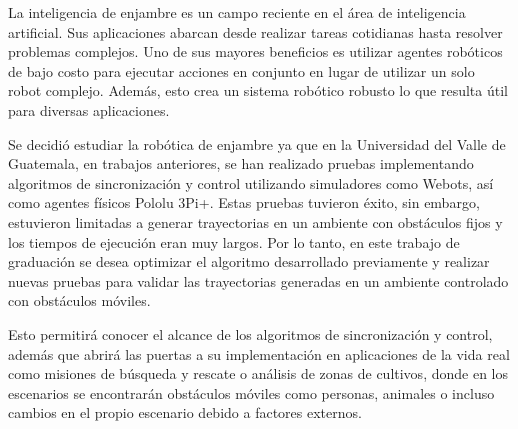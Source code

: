 La inteligencia de enjambre es un campo reciente en el área de inteligencia artificial. Sus aplicaciones abarcan desde realizar tareas cotidianas hasta resolver problemas complejos. Uno de sus mayores beneficios es utilizar agentes robóticos de bajo costo para ejecutar acciones en conjunto en lugar de utilizar un solo robot complejo. Además, esto crea un sistema robótico robusto lo que resulta útil para diversas aplicaciones.

Se decidió estudiar la robótica de enjambre ya que en la Universidad del Valle de Guatemala, en trabajos anteriores, se han realizado pruebas implementando algoritmos de sincronización y control utilizando simuladores como Webots, así como agentes físicos Pololu 3Pi+. Estas pruebas tuvieron éxito, sin embargo, estuvieron limitadas a generar trayectorias en un ambiente con obstáculos fijos y los tiempos de ejecución eran muy largos. Por lo tanto, en este trabajo de graduación se desea optimizar el algoritmo desarrollado previamente y realizar nuevas pruebas para validar las trayectorias generadas en un ambiente controlado con obstáculos móviles. 

Esto permitirá conocer el alcance de los algoritmos de sincronización y control, además que abrirá las puertas a su implementación en aplicaciones de la vida real como misiones de búsqueda y rescate o análisis de zonas de cultivos, donde en los escenarios se encontrarán obstáculos móviles como personas, animales o incluso cambios en el propio escenario debido a factores externos.
